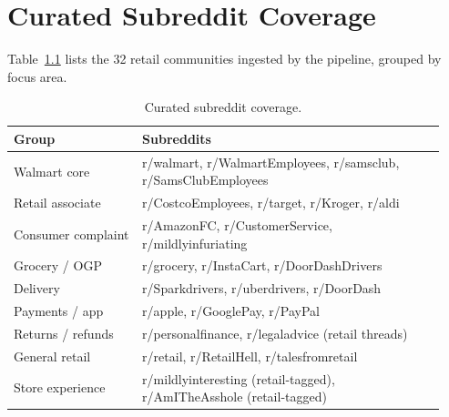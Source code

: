 \chapter{Curated Subreddit Coverage}\label{app:sub}

Table~\ref{tab:sub} lists the 32 retail communities ingested by the
pipeline, grouped by focus area.

\begin{table}[htbp]\centering
\caption{Curated subreddit coverage.}\label{tab:sub}
\small
\begin{tabular}{@{}p{0.28\linewidth}p{0.66\linewidth}@{}}\toprule
\bfseries Group & \bfseries Subreddits\\\midrule
Walmart core          & r/walmart, r/WalmartEmployees, r/samsclub, r/SamsClubEmployees\\
Retail associate      & r/CostcoEmployees, r/target, r/Kroger, r/aldi\\
Consumer complaint    & r/AmazonFC, r/CustomerService, r/mildlyinfuriating\\
Grocery / OGP         & r/grocery, r/InstaCart, r/DoorDashDrivers\\
Delivery              & r/Sparkdrivers, r/uberdrivers, r/DoorDash\\
Payments / app        & r/apple, r/GooglePay, r/PayPal\\
Returns / refunds     & r/personalfinance, r/legaladvice (retail threads)\\
General retail        & r/retail, r/RetailHell, r/talesfromretail\\
Store experience      & r/mildlyinteresting (retail-tagged), r/AmITheAsshole (retail-tagged)\\\bottomrule
\end{tabular}
\end{table}

